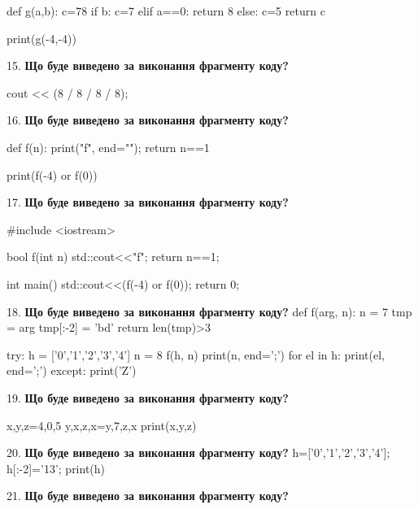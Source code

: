 \documentclass[11pt]{article}
\begin{document}
def g(a,b):
    c=78
    if b:
        c=7
    elif a==0:
         return 8
    else: 
        c=5
    return c

print(g(-4,-4))
\par\vspace{5mm}

15. \textbf{Що буде виведено за виконання фрагменту коду?}

cout << (8 / 8 / 8 / 8);
\par\vspace{5mm}

16. \textbf{Що буде виведено за виконання фрагменту коду?}

def f(n):
    print("f", end="");
    return n==1

print(f(-4) or f(0))
\par\vspace{5mm}

17. \textbf{Що буде виведено за виконання фрагменту коду?}

#include <iostream>

bool f(int n){
    std::cout<<"f";
    return n==1;
}

int main(){
    std::cout<<(f(-4) or f(0));
    return 0;
}
\par\vspace{5mm}

18. \textbf{Що буде виведено за виконання фрагменту коду?}
def f(arg, n):
    n = 7
    tmp = arg
    tmp[:-2] = 'bd'
    return len(tmp)>3

try:
    h = ['0','1','2','3','4']
    n = 8
    f(h, n)
    print(n, end=';')
    for el in h:
        print(el, end=';')
except:
    print('Z')
\par\vspace{5mm}

19. \textbf{Що буде виведено за виконання фрагменту коду?}

x,y,z=4,0,5
y,x,z,x=y,7,z,x
print(x,y,z)
\par\vspace{5mm}

20. \textbf{Що буде виведено за виконання фрагменту коду?}
h=['0','1','2','3','4']; h[:-2]='13'; print(h)\par\vspace{5mm}

21. \textbf{Що буде виведено за виконання фрагменту коду?}
\end{document}
